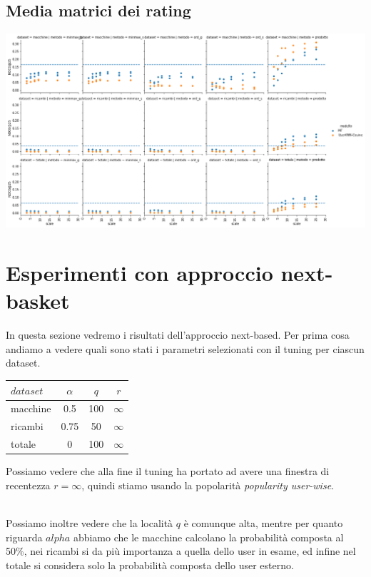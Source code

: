 \subsection{Media matrici dei rating}
\includegraphics[width=16cm]{figures/comb_2.png}

\section{Esperimenti con approccio next-basket}
In questa sezione vedremo i risultati dell'approccio next-based. Per prima cosa andiamo a vedere quali sono stati i parametri selezionati con il tuning per ciascun dataset.\\

\begin{minipage}[H]{0.45\textwidth}
    \begin{tabular}{|l|ccc|}
        \toprule
        $dataset$ &    $\alpha$ &  $q$ & $r$ \\
        \midrule
        macchine & 0.5 & 100 & $\infty$ \\
        ricambi  &	0.75 & 50 & $\infty$ \\
        totale  & 0 & 100 & $\infty$ \\
    \bottomrule
    \end{tabular}
\end{minipage}
\begin{minipage}[H]{0.55\textwidth}
    Possiamo vedere che alla fine il tuning ha portato ad avere una finestra di recentezza  $r = \infty$, quindi stiamo usando la popolarità \textit{popularity user-wise}. 
\end{minipage}\\

Possiamo inoltre vedere che la località $q$ è comunque alta, mentre per quanto riguarda $alpha$ abbiamo che le macchine calcolano la probabilità composta al 50\%, nei ricambi si da più importanza a quella dello user in esame, ed infine nel totale si considera solo la probabilità composta dello user esterno.

